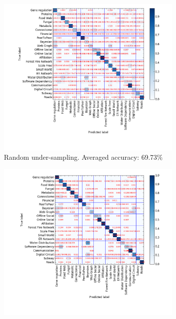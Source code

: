 \documentclass{article}
\begin{document}
\begin{figure}[H]
	\medskip
	\begin{subfigure}{0.48\textwidth}
	\includegraphics[width=\linewidth]{figs/similarity/SubDomain/RandomUnder_all5/confusion.png}
	\caption{Random under-sampling. Averaged accuracy: 69.73\%} \label{random_under_confusion_sub}
	\end{subfigure}\hspace*{\fill}
	\begin{subfigure}{0.48\textwidth}
	\includegraphics[width=\linewidth]{figs/similarity/SubDomain/SMOTE/confusion.png}

\end{subfigure}
\end{figure}
\end{document}
